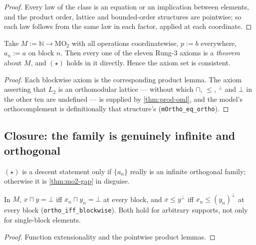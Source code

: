 \begin{proof}
  \leanok
  Every law of the class is an equation or an implication between elements, and
  the product order, lattice and bounded-order structures are pointwise; so each
  law follows from the same law in each factor, applied at each coordinate.
\end{proof}

\begin{theorem}
  \label{thm:descent-consistent}
  \leanok
  Take $M := \mathbb{N} \to \mathrm{MO}_2$ with all operations coordinatewise,
  $p := b$ everywhere, $a_n := a$ on block $n$. Then every one of the eleven
  Rung-3 axioms is a \emph{theorem} about $M$, and $(\star)$ holds in it
  directly. Hence the axiom set is consistent.
\end{theorem}

\begin{proof}
  \leanok
  Each blockwise axiom is the corresponding product lemma. The axiom asserting
  that $L_2$ is an orthomodular lattice --- without which $\sqcap$, $\le$,
  $^{\perp}$ and $\bot$ in the other ten are undefined --- is supplied by
  \ref{thm:prod-oml}, and the model's orthocomplement is definitionally that
  structure's (\texttt{mOrtho\_eq\_ortho}).
\end{proof}

\subsection{Closure: the family is genuinely infinite and orthogonal}

$(\star)$ is a descent statement only if $\{a_n\}$ really is an infinite
orthogonal family; otherwise it is \ref{thm:mo2-gap} in disguise.

\begin{lemma}
  \label{lem:legs-localize}
  \leanok
  In $M$, $x \sqcap y = \bot$ iff $x_n \sqcap y_n = \bot$ at every block, and
  $x \le y^{\perp}$ iff $x_n \le (y_n)^{\perp}$ at every block
  (\texttt{ortho\_iff\_blockwise}). Both hold for arbitrary supports, not only
  for single-block elements.
\end{lemma}

\begin{proof}
  \leanok
  Function extensionality and the pointwise product lemmas.
\end{proof}

